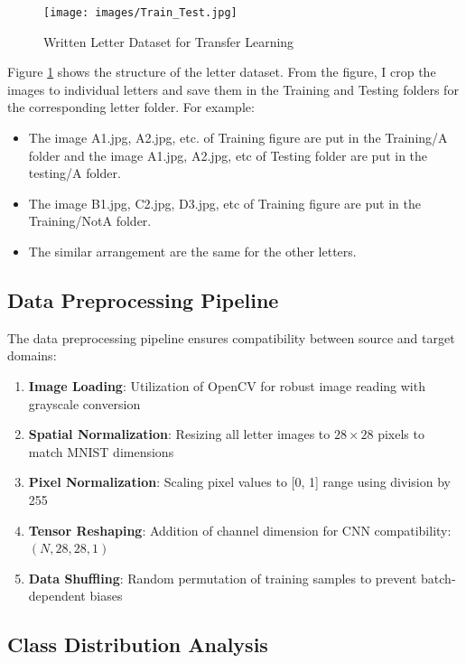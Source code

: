 \documentclass[12pt,a4paper]{article}
\begin{document}
\begin{figure}[H]
    \centering
    \texttt{[image: images/Train\_Test.jpg]}
    \caption{Written Letter Dataset for Transfer Learning}
    \label{fig:letter_dataset_structure}
\end{figure}


Figure \ref{fig:letter_dataset_structure} shows the structure of the letter dataset. 
From the figure, I crop the images to individual letters and save them in the Training and Testing folders for the corresponding letter folder.
For example:

\begin{itemize}
    \item The image A1.jpg, A2.jpg, etc. of Training figure are put in the Training/A folder and the image A1.jpg, A2.jpg, etc of Testing folder are put in the testing/A folder.
    \item The image B1.jpg, C2.jpg, D3.jpg, etc of Training figure are put in the Training/NotA folder.
    \item The similar arrangement are the same for the other letters.
\end{itemize}


\subsection{Data Preprocessing Pipeline}

The data preprocessing pipeline ensures compatibility between source and target domains:

\begin{enumerate}
    \item \textbf{Image Loading}: Utilization of OpenCV for robust image reading with grayscale conversion
    \item \textbf{Spatial Normalization}: Resizing all letter images to $28 \times 28$ pixels to match MNIST dimensions
    \item \textbf{Pixel Normalization}: Scaling pixel values to [0, 1] range using division by 255
    \item \textbf{Tensor Reshaping}: Addition of channel dimension for CNN compatibility: $(N, 28, 28, 1)$
    \item \textbf{Data Shuffling}: Random permutation of training samples to prevent batch-dependent biases
\end{enumerate}

\subsection{Class Distribution Analysis}
\end{document}
